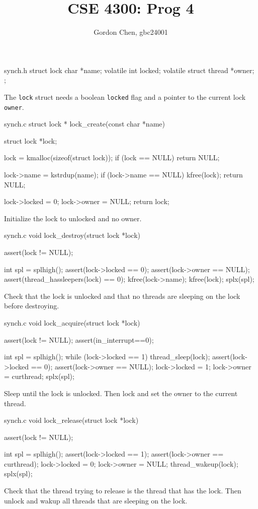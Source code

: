 \documentclass[10pt]{article}
\title{CSE 4300: Prog 4}
\author{Gordon Chen, gbc24001}
\date{}
\begin{document}
\maketitle


\begin{codefile}{synch.h}
struct lock {
    char *name;
    volatile int locked;
    volatile struct thread *owner;
};
\end{codefile}
The \verb|lock| struct needs a boolean \verb|locked| flag and a pointer to the current lock \verb|owner|.\\


\begin{codefile}{synch.c}
struct lock *
lock_create(const char *name)
{
    struct lock *lock;

    lock = kmalloc(sizeof(struct lock));
    if (lock == NULL) {
        return NULL;
    }

    lock->name = kstrdup(name);
    if (lock->name == NULL) {
        kfree(lock);
        return NULL;
    }

    lock->locked = 0;
    lock->owner = NULL;
    return lock;
}
\end{codefile}
Initialize the lock to unlocked and no owner.\\


\begin{codefile}{synch.c}
void
lock_destroy(struct lock *lock)
{
    assert(lock != NULL);

    int spl = splhigh();
    assert(lock->locked == 0);
    assert(lock->owner == NULL);
    assert(thread_hassleepers(lock) == 0);
    kfree(lock->name);
    kfree(lock);
    splx(spl);
}
\end{codefile}
Check that the lock is unlocked and that no threads are sleeping on the lock before destroying.\\


\begin{codefile}{synch.c}
void
lock_acquire(struct lock *lock)
{
    assert(lock != NULL);
    assert(in_interrupt==0);

    int spl = splhigh();
    while (lock->locked == 1) {
        thread_sleep(lock);
    }
    assert(lock->locked == 0);
    assert(lock->owner == NULL);
    lock->locked = 1;
    lock->owner = curthread;
    splx(spl);
}
\end{codefile}
Sleep until the lock is unlocked. Then lock and set the owner to the current thread.\\


\begin{codefile}{synch.c}
void
lock_release(struct lock *lock)
{
    assert(lock != NULL);

    int spl = splhigh();
    assert(lock->locked == 1);
    assert(lock->owner == curthread);
    lock->locked = 0;
    lock->owner = NULL;
    thread_wakeup(lock);
    splx(spl);
}
\end{codefile}
Check that the thread trying to release is the thread that has the lock.
Then unlock and wakup all threads that are sleeping on the lock.\\
\end{document}
